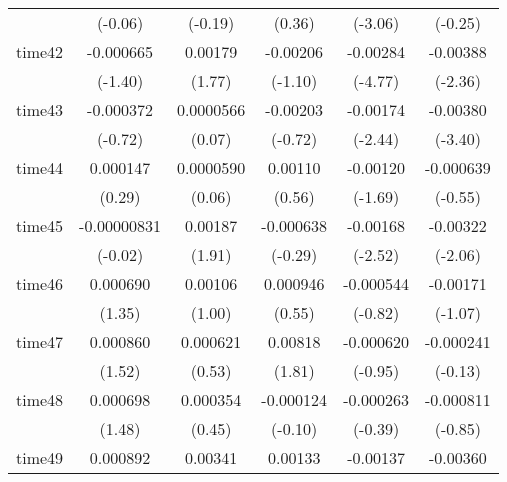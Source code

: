 \begin{table}[htbp]
\begin{tabular}{l*{5}{c}}
            &     (-0.06)         &     (-0.19)         &      (0.36)         &     (-3.06)         &     (-0.25)         \\
time42      &   -0.000665         &     0.00179         &    -0.00206         &    -0.00284\sym{***}&    -0.00388\sym{*}  \\
            &     (-1.40)         &      (1.77)         &     (-1.10)         &     (-4.77)         &     (-2.36)         \\
time43      &   -0.000372         &   0.0000566         &    -0.00203         &    -0.00174\sym{*}  &    -0.00380\sym{***}\\
            &     (-0.72)         &      (0.07)         &     (-0.72)         &     (-2.44)         &     (-3.40)         \\
time44      &    0.000147         &   0.0000590         &     0.00110         &    -0.00120         &   -0.000639         \\
            &      (0.29)         &      (0.06)         &      (0.56)         &     (-1.69)         &     (-0.55)         \\
time45      & -0.00000831         &     0.00187         &   -0.000638         &    -0.00168\sym{*}  &    -0.00322\sym{*}  \\
            &     (-0.02)         &      (1.91)         &     (-0.29)         &     (-2.52)         &     (-2.06)         \\
time46      &    0.000690         &     0.00106         &    0.000946         &   -0.000544         &    -0.00171         \\
            &      (1.35)         &      (1.00)         &      (0.55)         &     (-0.82)         &     (-1.07)         \\
time47      &    0.000860         &    0.000621         &     0.00818         &   -0.000620         &   -0.000241         \\
            &      (1.52)         &      (0.53)         &      (1.81)         &     (-0.95)         &     (-0.13)         \\
time48      &    0.000698         &    0.000354         &   -0.000124         &   -0.000263         &   -0.000811         \\
            &      (1.48)         &      (0.45)         &     (-0.10)         &     (-0.39)         &     (-0.85)         \\
time49      &    0.000892         &     0.00341\sym{*}  &     0.00133         &    -0.00137         &    -0.00360         \\

\end{tabular}
\end{table}
